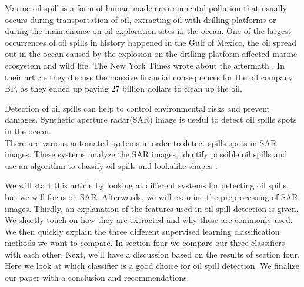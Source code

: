 Marine oil spill is a form of human made environmental pollution that usually occurs during transportation of oil, extracting oil with drilling platforms \cite{Zhang201476} or during the maintenance on oil exploration sites in the ocean. One of the largest occurrences of oil spills in history happened in the Gulf of Mexico, the oil spread out in the ocean caused by the explosion on the drilling platform affected marine ecosystem and wild life\cite{Bozeman2011244}. The New York Times wrote about the aftermath \cite{bpnytimes}. In their article they discuss the massive financial consequences for the oil company BP, as they ended up paying 27 billion dollars to clean up the oil.

Detection of oil spills can help to control environmental risks and prevent damages. Synthetic aperture radar(SAR) image is useful to detect oil spills spots in the ocean. \\
There are various automated systems in order to detect spills spots in SAR images. These systems analyze the SAR images, identify possible oil spills and use an algorithm to classify oil spills and lookalike shapes \cite{Xu201414,brekke2008classifiers,Keramitsoglou2006640,Guo2014146}.

We will start this article by looking at different systems for detecting oil spills, but we will focus on SAR. Afterwards, we will examine the preprocessing of SAR images. Thirdly, an explanation of the features used in oil spill detection is given. We shortly touch on how they are extracted and why these are commonly used. We then quickly explain the three different supervised learning classification methods we want to compare. In section four we compare our three classifiers with each other. Next, we'll have a discussion based on the results of section four. Here we look at which classifier is a good choice for oil spill detection. We finalize our paper with a conclusion and recommendations.